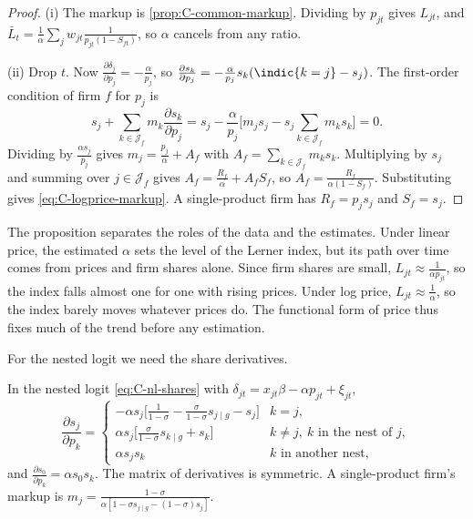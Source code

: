 \begin{proof}
(i) The markup is \cref{prop:C-common-markup}. Dividing by $p_{jt}$ gives $L_{jt}$, and
$\bar L_t = \frac{1}{\alpha}\sum_jw_{jt}\frac{1}{p_{jt}(1 - S_{ft})}$, so $\alpha$ cancels from any ratio.

(ii) Drop $t$. Now $\frac{\partial\delta_j}{\partial p_j} = -\frac{\alpha}{p_j}$, so
$\frac{\partial s_k}{\partial p_j} = -\frac{\alpha}{p_j}s_k(\indic\{k = j\} - s_j)$. The first-order condition of firm
$f$ for $p_j$ is
\[
  s_j + \sum_{k \in \mathcal{J}_f}m_k\frac{\partial s_k}{\partial p_j}
  = s_j - \frac{\alpha}{p_j}\Big[m_js_j - s_j\sum_{k \in \mathcal{J}_f}m_ks_k\Big] = 0 .
\]
Dividing by $\frac{\alpha s_j}{p_j}$ gives $m_j = \frac{p_j}{\alpha} + A_f$ with $A_f = \sum_{k \in \mathcal{J}_f}m_ks_k$.
Multiplying by $s_j$ and summing over $j \in \mathcal{J}_f$ gives $A_f = \frac{R_f}{\alpha} + A_fS_f$, so
$A_f = \frac{R_f}{\alpha(1 - S_f)}$. Substituting gives \eqref{eq:C-logprice-markup}. A single-product firm has
$R_f = p_js_j$ and $S_f = s_j$.
\end{proof}

The proposition separates the roles of the data and the estimates. Under linear price, the estimated $\alpha$ sets the
level of the Lerner index, but its path over time comes from prices and firm shares alone. Since firm shares are small,
$L_{jt} \approx \frac{1}{\alpha p_{jt}}$, so the index falls almost one for one with rising prices. Under log price,
$L_{jt} \approx \frac{1}{\alpha}$, so the index barely moves whatever prices do. The functional form of price thus fixes
much of the trend before any estimation.

For the nested logit we need the share derivatives.

\begin{proposition}\label{prop:C-nl-deriv}
In the nested logit \eqref{eq:C-nl-shares} with $\delta_{jt} = x_{jt}\beta - \alpha p_{jt} + \xi_{jt}$,
\begin{equation}\label{eq:C-nl-deriv}
  \frac{\partial s_j}{\partial p_k} =
  \begin{cases}
    -\alpha s_j\Big[\frac{1}{1 - \sigma} - \frac{\sigma}{1 - \sigma}s_{j\mid g} - s_j\Big] & k = j , \\[6pt]
    \alpha s_j\Big[\frac{\sigma}{1 - \sigma}s_{k\mid g} + s_k\Big] & k \ne j,\ k \text{ in the nest of } j , \\[6pt]
    \alpha s_js_k & k \text{ in another nest} ,
  \end{cases}
\end{equation}
and $\frac{\partial s_0}{\partial p_k} = \alpha s_0s_k$. The matrix of derivatives is symmetric. A single-product firm's
markup is $m_j = \frac{1 - \sigma}{\alpha[1 - \sigma s_{j\mid g} - (1 - \sigma)s_j]}$.
\end{proposition}

